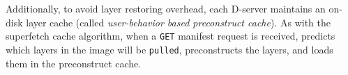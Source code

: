 Additionally, to avoid layer restoring overhead,
each D-server maintains an on-disk layer cache (called \emph{user-behavior based preconstruct cache}).
%
As with the superfetch cache algorithm,
when a \texttt{GET} manifest request is received,
\sysname predicts which layers in the image will be \texttt{pulled},
preconstructs the layers, and loads them in the preconstruct cache.
%
